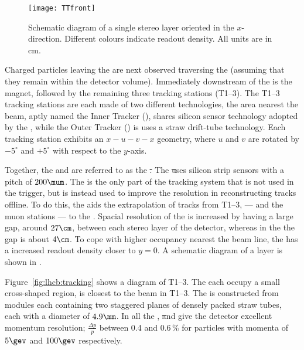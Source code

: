 \begin{figure}
  \begin{center}
    \texttt{[image: TTfront]}
    \caption[The LHCb Tracker Turicensis geometry]
    {\small
      Schematic diagram of a single stereo \ttracker layer oriented in the $x$-direction.
      Different colours indicate readout density.
      All units are in cm.
    }
    \label{fig:lhcb:tt}
  \end{center}
\end{figure}

Charged particles leaving the \velo are next observed traversing the \ttracker (assuming that they
remain within the \lhcb detector volume).
Immediately downstream of the \ttracker is the \lhcb magnet, followed by the remaining three
tracking stations (T1--3).
The T1--3 tracking stations are each made of two different technologies, the area nearest the beam,
aptly named the Inner Tracker (\intr), shares silicon sensor technology adopted by the \ttracker,
while the Outer Tracker (\ot) is uses a straw drift-tube technology.
Each tracking station exhibits an $x-u-v-x$ geometry, where $u$ and $v$ are rotated by $-5^\circ$ and
$+5^\circ$ with respect to the $y$-axis.

Together, the \ttracker and \intr are referred to as the \st.
The \st uses silicon strip sensors with a pitch of $200\mum$.
The \ttracker is the only part of the tracking system that is not used in the trigger, but is
instead used to improve the resolution in reconstructing tracks offline.
To do this, the \ttracker aids the extrapolation of tracks from T1--3, --- and the muon stations
--- to the \velo.
Spacial resolution of the \ttracker is increased by having a large gap, around $27\cm$, between
each stereo layer of the detector, whereas in the \intr the gap is about $4\cm$.
To cope with higher occupancy nearest the beam line, the \ttracker has a increased readout density
closer to $y=0$.
A schematic diagram of a \ttracker layer is shown in .

Figure~\ref{fig:lhcb:tracking} shows a diagram of T1--3.
The  each occupy a small cross-shaped region, is closest to the beam in T1--3.
The \ot is constructed from modules each containing two staggered planes of densely packed straw
tubes, each with a diameter of  $4.9\mm$.
In all the \velo, \st and \ot give the \lhcb detector excellent momentum resolution;
$\tfrac{\Delta p}{p}$ between 0.4 and 0.6\,\% for particles with momenta of $5\gev$ and $100\gev$
respectively.

